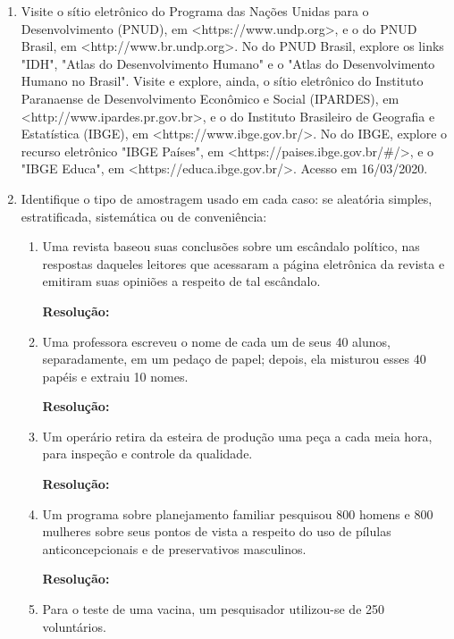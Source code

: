 \begin{enumerate}[label=\emph{\arabic*})]
	\item Visite o sítio eletrônico do Programa das Nações Unidas para o Desenvolvimento (PNUD), em <https://www.undp.org>, e o do PNUD
	      Brasil, em <http://www.br.undp.org>. No do PNUD Brasil, explore os links "IDH", "Atlas do Desenvolvimento Humano" e o "Atlas do Desenvolvimento Humano no Brasil". Visite e
	      explore, ainda, o sítio eletrônico do Instituto Paranaense de Desenvolvimento
	      Econômico e Social (IPARDES), em <http://www.ipardes.pr.gov.br>, e o do Instituto
	      Brasileiro de Geografia e Estatística (IBGE), em <https://www.ibge.gov.br/>. No do
	      IBGE, explore o recurso eletrônico "IBGE Países", em <https://paises.ibge.gov.br/\#/>,
	      e o "IBGE Educa", em <https://educa.ibge.gov.br/>. Acesso em 16/03/2020.

	\item Identifique o tipo de amostragem usado em cada caso: se aleatória simples,
	      estratificada, sistemática ou de conveniência:

	      \begin{enumerate}[label=\emph{\alph*})]

		      \item Uma revista baseou suas conclusões sobre um escândalo político, nas respostas
		            daqueles leitores que acessaram a página eletrônica da revista e emitiram suas
		            opiniões a respeito de tal escândalo.

		            \textbf{Resolução:}~

		      \item Uma professora escreveu o nome de cada um de seus 40 alunos, separadamente,
		            em um pedaço de papel; depois, ela misturou esses 40 papéis e extraiu 10 nomes.

		            \textbf{Resolução:}~

		      \item Um operário retira da esteira de produção uma peça a cada meia hora, para inspeção
		            e controle da qualidade.

		            \textbf{Resolução:}~

		      \item Um programa sobre planejamento familiar pesquisou 800 homens e 800 mulheres
		            sobre seus pontos de vista a respeito do uso de pílulas anticoncepcionais e de
		            preservativos masculinos.

		            \textbf{Resolução:}~

		      \item Para o teste de uma vacina, um pesquisador utilizou-se de 250 voluntários.


\end{enumerate}
\end{enumerate}
